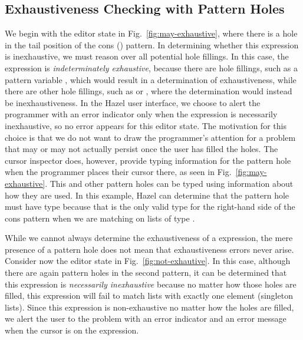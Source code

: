 \subsection{Exhaustiveness Checking with Pattern Holes}
\label{sec:hazel-exhaustiveness}
We begin with the editor state in Fig.~\ref{fig:may-exhaustive}, 
where there is a hole in the tail position of the cons (\li{::}) pattern.
In determining whether this  expression is inexhaustive, we 
must reason over all potential hole fillings. In this case, the 
 expression is \emph{indeterminately exhaustive}, because there are hole fillings,
such as a pattern variable , which would result in a determination
of exhaustiveness, while there are other hole fillings, such as \li{[]} or ,
where the determination would instead be inexhaustiveness. In the Hazel user interface, we choose to alert the programmer with an error
indicator only when the  expression is necessarily inexhaustive,
so no error appears for this editor state. The motivation for this choice is that we do not want to draw the programmer's attention for a problem that may or may not actually persist once the user has filled the holes. The cursor inspector does, however, provide typing information for the pattern hole when the programmer places their cursor there, as seen in Fig.~\ref{fig:may-exhaustive}. This and other pattern holes can be typed using information about how they are used. In this example, Hazel can determine that the pattern hole must have type \li{[Int]} because that is the only valid type for the right-hand side of the cons pattern when we are matching on lists of type \li{[Int]}.

While we cannot always determine the exhaustiveness of a  expression, the mere presence of a pattern hole does not mean that exhaustiveness errors never arise. Consider now
the editor state in Fig.~\ref{fig:not-exhautive}. In this case,
although there are again pattern holes in the second pattern, 
it can be determined that this  expression is \emph{necessarily inexhaustive}
because no matter how those holes are filled, this  expression will fail to 
match lists with exactly one element (singleton lists). Since this  expression is non-exhaustive no matter how the holes are filled,
we alert the user to the problem with an error indicator and an error message when the cursor is on the  expression.


